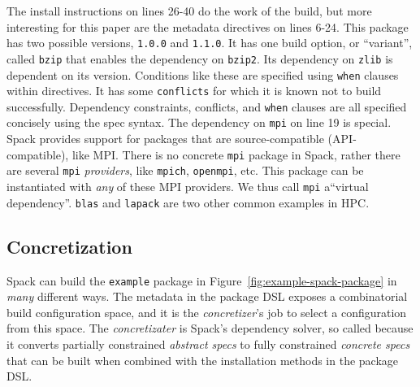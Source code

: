 The install instructions on lines 26-40 do the work of the build, but more interesting
for this paper are the metadata directives on lines 6-24. This package has two possible
versions, {\tt 1.0.0} and {\tt 1.1.0}. It has one build option, or ``variant'', called
{\tt bzip} that enables the dependency on {\tt bzip2}. Its dependency on {\tt zlib} is
dependent on its version. Conditions like these are specified using {\tt when} clauses
within directives. It has some {\tt conflicts} for which it is known not to build
successfully. Dependency constraints, conflicts, and {\tt when} clauses are all
specified concisely using the  spec syntax.
%
The dependency on {\tt mpi} on line 19 is special. Spack provides support for packages
that are source-compatible (API-compatible), like MPI. There is no concrete {\tt mpi}
package in Spack, rather there are several {\tt mpi} {\it providers}, like {\tt mpich},
{\tt openmpi}, etc. This package can be instantiated with {\it any} of these MPI
providers. We thus call {\tt mpi} a``virtual dependency''. {\tt blas} and {\tt lapack}
are two other common examples in HPC.

\subsection{Concretization}

Spack can build the {\tt example} package in Figure~\ref{fig:example-spack-package} in
{\it many} different ways. The metadata in the package DSL exposes a combinatorial build
configuration space, and it is the {\it concretizer}'s job to select a configuration
from this space. The {\it concretizater} is Spack's dependency solver, so called because
it converts partially constrained \emph{abstract specs} to fully constrained
\emph{concrete specs} that can be built when combined with the installation methods in
the package DSL.

